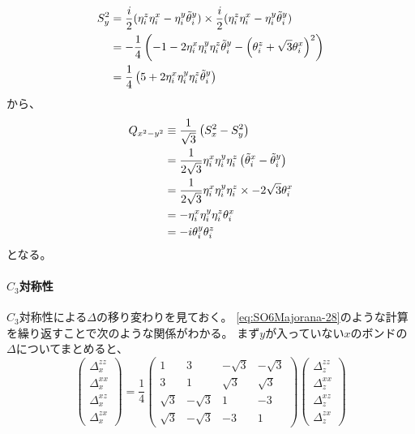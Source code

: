 \documentclass[11pt, aps, longbibliography]{article}
\begin{document}
        \begin{align}\label{eq:app-MajoranaMF-4}
            S_y^2 &= \frac{i}{2}(\eta_i^z\eta_i^x - \eta_i^y\tilde{\theta}_i^y) \times \frac{i}{2}(\eta_i^z\eta_i^x - \eta_i^y\tilde{\theta}_i^y) \notag \\
            &= -\frac{1}{4} \left( -1 -2\eta_i^x\eta_i^y\eta_i^z\tilde{\theta}_i^y - \left(\theta_i^z + \sqrt{3}\theta_i^x\right)^2 \right) \notag \\
            &= \frac{1}{4} \left( 5 + 2\eta_i^x\eta_i^y\eta_i^z\tilde{\theta}_i^y  \right)
        \end{align}
        から、
        \begin{align}\label{eq:app-MajoranaMF-5}
            Q_{x^2-y^2} &\equiv \frac{1}{\sqrt{3}} \left( S_x^2-S_y^2 \right) \notag \\
            &= \frac{1}{2\sqrt{3}}\eta_i^x\eta_i^y\eta_i^z\left( \tilde{\theta}_i^x - \tilde{\theta}_i^y \right) \notag \\
            &= \frac{1}{2\sqrt{3}}\eta_i^x\eta_i^y\eta_i^z \times -2\sqrt{3}\theta_i^x \notag \\
            &= -\eta_i^x\eta_i^y\eta_i^z\theta_i^x \notag \\
            &= -i\theta_i^y\theta_i^z
        \end{align}
        となる。

        \paragraph{$C_3$対称性}
        $C_3$対称性による$\Delta$の移り変わりを見ておく。
        \eqref{eq:SO6Majorana-28}のような計算を繰り返すことで次のような関係がわかる。
        まず$y$が入っていない$x$のボンドの$\Delta$についてまとめると、
        \begin{equation}\label{eq:app-MajoranaMF-1-1}
            \begin{pmatrix}
                \Delta_x^{zz} \\ \Delta_x^{xx} \\ \Delta_x^{xz}\\ \Delta_x^{zx}
            \end{pmatrix} = \frac{1}{4} \begin{pmatrix}
                1 & 3 & -\sqrt{3} & -\sqrt{3} \\ 3 & 1 & \sqrt{3} & \sqrt{3} \\ \sqrt{3} & -\sqrt{3} & 1 & -3 \\ \sqrt{3} & -\sqrt{3} & -3 & 1
            \end{pmatrix} \begin{pmatrix}
                \Delta_z^{zz} \\ \Delta_z^{xx} \\ \Delta_z^{xz}\\ \Delta_z^{zx}
            \end{pmatrix}
        \end{equation}


\newpage
\printbibliography
\end{document}
